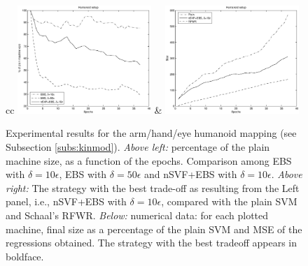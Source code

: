 \documentclass[conference]{IEEEtran}
\begin{document}
\begin{figure}[!htbp]
  \begin{center}
    \begin{tabular}{cc}
       \includegraphics[width=0.45\textwidth]{fig1b} &
       \includegraphics[width=0.45\textwidth]{fig2b} \\[5mm]
    \end{tabular}
  \end{center}
  \caption{\label{fig:hum} Experimental results for the arm/hand/eye
    humanoid mapping (see Subsection \ref{subs:kinmod}). \emph{Above
    left:} percentage of the plain machine size, as a function of the
    epochs. Comparison among EBS with $\delta=10\epsilon$, EBS with
    $\delta=50\epsilon$ and nSVF+EBS with
    $\delta=10\epsilon$. \emph{Above right:} The strategy with the
    best trade-off as resulting from the Left panel, i.e., nSVF+EBS
    with $\delta=10\epsilon$, compared with the plain SVM and Schaal's
    RFWR. \emph{Below:} numerical data: for each plotted machine,
    final size as a percentage of the plain SVM and MSE of the
    regressions obtained. The strategy with the best tradeoff appears
    in boldface.}
\end{figure}
\end{document}
